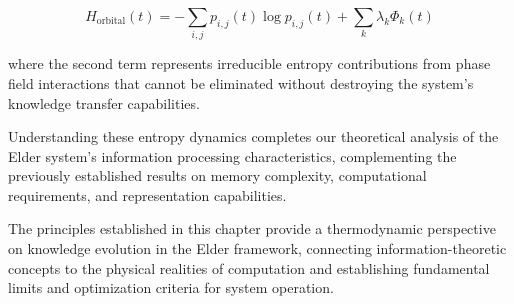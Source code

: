 \begin{equation}
H_{\text{orbital}}(t) = -\sum_{i,j} p_{i,j}(t) \log p_{i,j}(t) + \sum_k \lambda_k \Phi_k(t)
\end{equation}

where the second term represents irreducible entropy contributions from phase field interactions that cannot be eliminated without destroying the system's knowledge transfer capabilities.

Understanding these entropy dynamics completes our theoretical analysis of the Elder system's information processing characteristics, complementing the previously established results on memory complexity, computational requirements, and representation capabilities.

The principles established in this chapter provide a thermodynamic perspective on knowledge evolution in the Elder framework, connecting information-theoretic concepts to the physical realities of computation and establishing fundamental limits and optimization criteria for system operation.